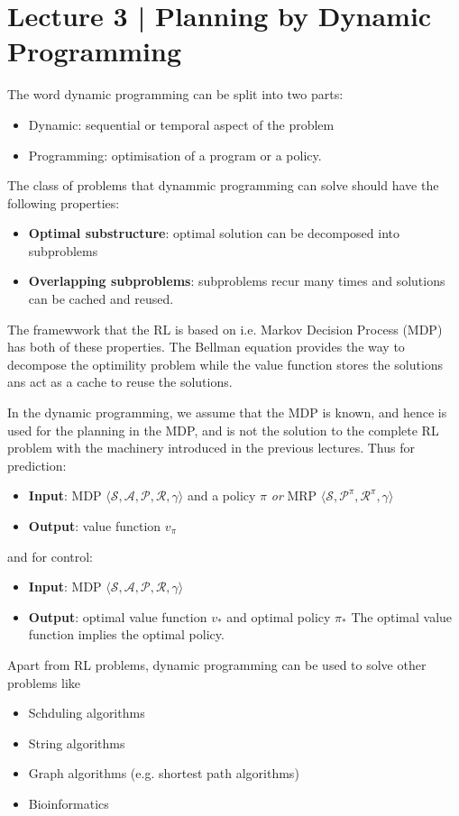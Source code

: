 \section{Lecture 3 | Planning by Dynamic Programming}
The word dynamic programming can be split into two parts:
\begin{itemize} 
    \item Dynamic: sequential or temporal aspect of the problem
    \item Programming: optimisation of a program or a policy.
    \end{itemize}

The class of problems that dynammic programming can solve should have the following properties:
\begin{itemize}
    \item \textbf{Optimal substructure}: optimal solution can be decomposed into subproblems
    \item \textbf{Overlapping subproblems}: subproblems recur many times and 
    solutions can be cached and reused.
\end{itemize}
The framewwork that the RL is based on i.e. Markov Decision Process (MDP) has both 
of these properties. The Bellman equation provides the way to decompose the optimility problem
while the value function stores the solutions ans act as a cache to reuse the solutions.

In the dynamic programming, we assume that the MDP is known, and hence is used for the planning
in the MDP, and is not the solution to the complete RL problem with the machinery introduced
in the previous lectures.
Thus for prediction:
\begin{itemize}
    \item \textbf{Input}: MDP \(
        \langle \mathcal{S}, \mathcal{A}, \mathcal{P}, \mathcal{R}, \gamma \rangle
        \) and a policy \(\pi\) \emph{or} MRP \(
        \langle \mathcal{S}, \mathcal{P}^{\pi}, \mathcal{R}^{\pi}, \gamma \rangle
        \)
    \item \textbf{Output}: value function \(v_{\pi}\)
\end{itemize}
and for control:
\begin{itemize}
    \item \textbf{Input}: MDP \(
        \langle \mathcal{S}, \mathcal{A}, \mathcal{P}, \mathcal{R}, \gamma \rangle
        \)
    \item \textbf{Output}: optimal value function \(v_{*}\) and optimal policy \(\pi_{*}\)
    The optimal value function implies the optimal policy.
\end{itemize}
Apart from RL problems, dynamic programming can be used to solve other problems like
\begin{itemize}
    \item Schduling algorithms
    \item String algorithms
    \item Graph algorithms (e.g. shortest path algorithms)
    \item Bioinformatics
\end{itemize}

